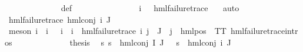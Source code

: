 \begin{isabellebody}
\ \ \ \ \ \ \ \ \ \ \ \ \isamarkupfalse%
\ {\isasymPsi}{\isacharunderscore}{\kern0pt}def\isanewline
\ \ \ \ \ \ \ \ \ \ \ \ \isamarkupfalse%
\ {\isacartoucheopen}{\isasymPsi}\ {\isacharbackquote}{\kern0pt}\ {\isacharbraceleft}{\kern0pt}i{\isacharunderscore}{\kern0pt}{\isasymphi}{\isacharbraceright}{\kern0pt}\ {\isacharequal}{\kern0pt}\ {\isacharbraceleft}{\kern0pt}{\isasympsi}{\isacharbraceright}{\kern0pt}{\isacartoucheclose}\ {\isacartoucheopen}hml{\isacharunderscore}{\kern0pt}failure{\isacharunderscore}{\kern0pt}trace\ {\isasympsi}{\isacartoucheclose}\ \isamarkupfalse%
\ auto\isanewline
\ \ \ \ \ \ \ \ \ \ \isamarkupfalse%
\ {\isachardoublequoteopen}hml{\isacharunderscore}{\kern0pt}failure{\isacharunderscore}{\kern0pt}trace\ {\isacharparenleft}{\kern0pt}hml{\isacharunderscore}{\kern0pt}conj\ {\isacharbraceleft}{\kern0pt}i{\isacharunderscore}{\kern0pt}{\isasymphi}{\isacharbraceright}{\kern0pt}\ J\ {\isasymPsi}{\isacharparenright}{\kern0pt}{\isachardoublequoteclose}\isanewline
\ \ \ \ \ \ \ \ \ \ \ \ \isamarkupfalse%
\ {\isacharparenleft}{\kern0pt}meson\ {\isacartoucheopen}{\isasymexists}i{\isasymin}{\isasymPsi}\ {\isacharbackquote}{\kern0pt}\ {\isacharbraceleft}{\kern0pt}i{\isacharunderscore}{\kern0pt}{\isasymphi}{\isacharbraceright}{\kern0pt}{\isachardot}{\kern0pt}\ {\isasymPsi}\ {\isacharbackquote}{\kern0pt}\ {\isacharbraceleft}{\kern0pt}i{\isacharunderscore}{\kern0pt}{\isasymphi}{\isacharbraceright}{\kern0pt}\ {\isacharequal}{\kern0pt}\ {\isacharbraceleft}{\kern0pt}i{\isacharbraceright}{\kern0pt}\ {\isasymand}\ hml{\isacharunderscore}{\kern0pt}failure{\isacharunderscore}{\kern0pt}trace\ i{\isacartoucheclose}\ {\isacartoucheopen}{\isasymforall}j{\isasymin}{\isasymPsi}\ {\isacharbackquote}{\kern0pt}\ J{\isachardot}{\kern0pt}\ {\isasymexists}{\isasymalpha}{\isachardot}{\kern0pt}\ j\ {\isacharequal}{\kern0pt}\ hml{\isacharunderscore}{\kern0pt}pos\ {\isasymalpha}\ TT{\isacartoucheclose}\ hml{\isacharunderscore}{\kern0pt}failure{\isacharunderscore}{\kern0pt}trace{\isachardot}{\kern0pt}intros{\isacharparenleft}{\kern0pt}{}{\isacharparenright}{\kern0pt}{\isacharparenright}{\kern0pt}\isanewline
\ \ \ \ \ \ \ \ \ \ \isamarkupfalse%
\ \isamarkupfalse%
\ {\isacharquery}{\kern0pt}thesis\ \isamarkupfalse%
\ {\isacartoucheopen}{\isasymforall}s{\isachardot}{\kern0pt}\ s\ {\isasymTurnstile}\ {\isacharparenleft}{\kern0pt}hml{\isacharunderscore}{\kern0pt}conj\ I\ J\ {\isasymPhi}{\isacharparenright}{\kern0pt}\ {\isasymlongleftrightarrow}\ s\ {\isasymTurnstile}\ {\isacharparenleft}{\kern0pt}hml{\isacharunderscore}{\kern0pt}conj\ {\isacharbraceleft}{\kern0pt}i{\isacharunderscore}{\kern0pt}{\isasymphi}{\isacharbraceright}{\kern0pt}\ J\ {\isasymPsi}{\isacharparenright}{\kern0pt}{\isacartoucheclose}\isanewline

\end{isabellebody}
